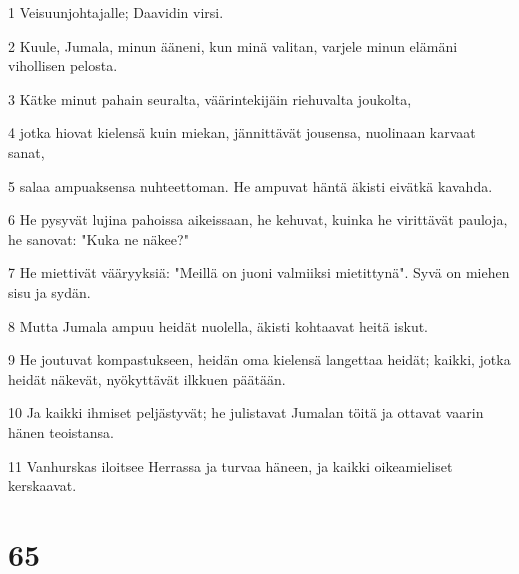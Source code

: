 \par 1 Veisuunjohtajalle; Daavidin virsi.
\par 2 Kuule, Jumala, minun ääneni, kun minä valitan, varjele minun elämäni vihollisen pelosta.
\par 3 Kätke minut pahain seuralta, väärintekijäin riehuvalta joukolta,
\par 4 jotka hiovat kielensä kuin miekan, jännittävät jousensa, nuolinaan karvaat sanat,
\par 5 salaa ampuaksensa nuhteettoman. He ampuvat häntä äkisti eivätkä kavahda.
\par 6 He pysyvät lujina pahoissa aikeissaan, he kehuvat, kuinka he virittävät pauloja, he sanovat: "Kuka ne näkee?"
\par 7 He miettivät vääryyksiä: "Meillä on juoni valmiiksi mietittynä". Syvä on miehen sisu ja sydän.
\par 8 Mutta Jumala ampuu heidät nuolella, äkisti kohtaavat heitä iskut.
\par 9 He joutuvat kompastukseen, heidän oma kielensä langettaa heidät; kaikki, jotka heidät näkevät, nyökyttävät ilkkuen päätään.
\par 10 Ja kaikki ihmiset peljästyvät; he julistavat Jumalan töitä ja ottavat vaarin hänen teoistansa.
\par 11 Vanhurskas iloitsee Herrassa ja turvaa häneen, ja kaikki oikeamieliset kerskaavat.

\chapter{65}

